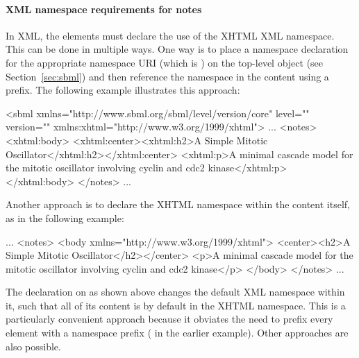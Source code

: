 

\paragraph{XML namespace requirements for notes}

In XML, the  elements must declare the use of
the XHTML XML namespace.  This can be done in multiple ways.  One
way is to place a namespace declaration for the appropriate
namespace URI (which is ) on the
top-level \SBML object (see Section~\ref{sec:sbml}) and then
reference the namespace in the  content using a
prefix.  The following example illustrates this approach:

\begin{example}
<sbml xmlns="http://www.sbml.org/sbml/level\sbmllevel/version\sbmlversionnum/core" level="\sbmllevel" version="\sbmlversionnum"
      xmlns:xhtml="http://www.w3.org/1999/xhtml">
  ...
  <notes>
    <xhtml:body>
      <xhtml:center><xhtml:h2>A Simple Mitotic Oscillator</xhtml:h2></xhtml:center>
      <xhtml:p>A minimal cascade model for the mitotic oscillator
      involving cyclin and cdc2 kinase</xhtml:p>
    </xhtml:body>
  </notes>
  ...
\end{example}

Another approach is to declare the XHTML namespace within the
 content itself, as in the following example:

\begin{example}
...
<notes>
  <body xmlns="http://www.w3.org/1999/xhtml">
    <center><h2>A Simple Mitotic Oscillator</h2></center>
    <p>A minimal cascade model for the mitotic oscillator
    involving cyclin and cdc2 kinase</p>
  </body>
</notes>
...
\end{example}

The  declaration on
 as shown above changes the default XML namespace
within it, such that all of its content is by default in the XHTML
namespace.  This is a particularly convenient approach because it
obviates the need to prefix every element with a namespace prefix
(\ie {} in the earlier example).  Other
approaches are also possible.


